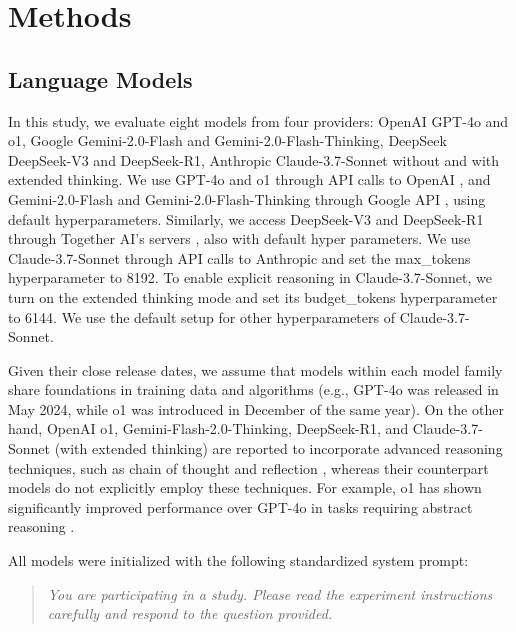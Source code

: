 \section*{Methods}
\subsection*{Language Models} \label{models_setup}
In this study, we evaluate eight models from four providers: OpenAI GPT-4o and o1, Google Gemini-2.0-Flash and Gemini-2.0-Flash-Thinking, DeepSeek DeepSeek-V3 and DeepSeek-R1, Anthropic Claude-3.7-Sonnet without and with extended thinking. 
We use GPT-4o and o1 through API calls to OpenAI \cite{openai_docs}, and Gemini-2.0-Flash and Gemini-2.0-Flash-Thinking through Google API \cite{google_gemini_docs}, using default hyperparameters. 
Similarly, we access DeepSeek-V3 and DeepSeek-R1 through Together AI’s servers \cite{together_ai}, also with default hyper parameters.
We use Claude-3.7-Sonnet through API calls to Anthropic \cite{claude_docs} and set the max\_tokens hyperparameter to 8192. To enable explicit reasoning in Claude-3.7-Sonnet, we turn on the extended thinking mode and set its budget\_tokens hyperparameter to 6144. We use the default setup for other hyperparameters of Claude-3.7-Sonnet.

Given their close release dates, we assume that models within each model family share foundations in training data and algorithms (e.g., GPT-4o was released in May 2024, while o1 was introduced in December of the same year).
On the other hand, OpenAI o1, Gemini-Flash-2.0-Thinking, DeepSeek-R1, and Claude-3.7-Sonnet (with extended thinking) are reported to incorporate advanced reasoning techniques, such as chain of thought and reflection \cite{jaech2024openai, google_gemini_docs, guo2025deepseek, claude_docs}, whereas their counterpart models do not explicitly employ these techniques.
For example, o1 has shown significantly improved performance over GPT-4o in tasks requiring abstract reasoning \cite{jaech2024openai}.

All models were initialized with the following standardized system prompt:
\begin{quote}
\textit{You are participating in a study. Please read the experiment instructions carefully and respond to the question provided.}
\end{quote}

